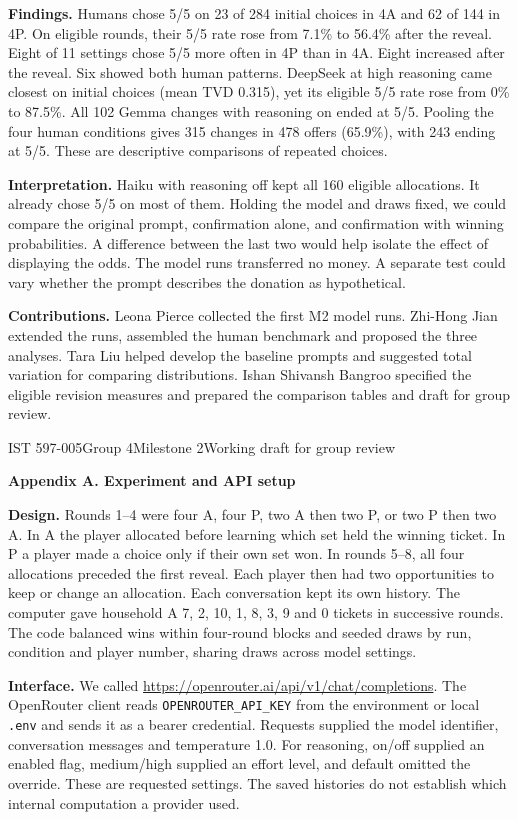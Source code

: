 \documentclass[11pt,letterpaper]{article}
\newcommand{\head}[1]{\par\vspace{2pt}\noindent\textbf{#1}\hspace{.3em}}
\newcommand{\titleline}[1]{{\LARGE\bfseries #1\par}\vspace{3pt}}
\begin{document}
\head{Findings.} Humans chose 5/5 on 23 of 284 initial choices in 4A and 62 of 144 in 4P. On eligible rounds, their 5/5 rate rose from 7.1\% to 56.4\% after the reveal. Eight of 11 settings chose 5/5 more often in 4P than in 4A. Eight increased after the reveal. Six showed both human patterns. DeepSeek at high reasoning came closest on initial choices (mean TVD 0.315), yet its eligible 5/5 rate rose from 0\% to 87.5\%. All 102 Gemma changes with reasoning on ended at 5/5. Pooling the four human conditions gives 315 changes in 478 offers (65.9\%), with 243 ending at 5/5. These are descriptive comparisons of repeated choices.

\head{Interpretation.} Haiku with reasoning off kept all 160 eligible allocations. It already chose 5/5 on most of them. Holding the model and draws fixed, we could compare the original prompt, confirmation alone, and confirmation with winning probabilities. A difference between the last two would help isolate the effect of displaying the odds. The model runs transferred no money. A separate test could vary whether the prompt describes the donation as hypothetical.

{\small\head{Contributions.} Leona Pierce collected the first M2 model runs. Zhi-Hong Jian extended the runs, assembled the human benchmark and proposed the three analyses. Tara Liu helped develop the baseline prompts and suggested total variation for comparing distributions. Ishan Shivansh Bangroo specified the eligible revision measures and prepared the comparison tables and draft for group review.}

\newpage
{\small IST 597-005\quad Group 4\quad Milestone 2\quad Working draft for group review}\par
\titleline{Appendix A. Experiment and API setup}
\head{Design.} Rounds 1--4 were four A, four P, two A then two P, or two P then two A. In A the player allocated before learning which set held the winning ticket. In P a player made a choice only if their own set won. In rounds 5--8, all four allocations preceded the first reveal. Each player then had two opportunities to keep or change an allocation. Each conversation kept its own history. The computer gave household A 7, 2, 10, 1, 8, 3, 9 and 0 tickets in successive rounds. The code balanced wins within four-round blocks and seeded draws by run, condition and player number, sharing draws across model settings.

\head{Interface.} We called \url{https://openrouter.ai/api/v1/chat/completions}. The OpenRouter client reads \texttt{OPENROUTER\_API\_KEY} from the environment or local \texttt{.env} and sends it as a bearer credential. Requests supplied the model identifier, conversation messages and temperature 1.0. For reasoning, on/off supplied an enabled flag, medium/high supplied an effort level, and default omitted the override. These are requested settings. The saved histories do not establish which internal computation a provider used.
\end{document}
